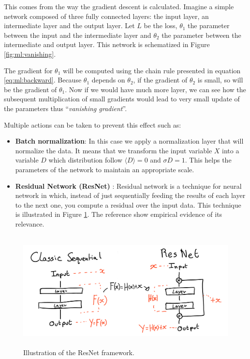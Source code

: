 \documentclass[../main.tex]{subfiles}
\begin{document}
This comes from the way the gradient descent is calculated. Imagine a simple network composed of three fully connected layers: the input layer, an intermediate layer and the output layer. Let $L$ be the loss, $\theta_1$ the parameter between the input and the intermediate layer and $\theta_2$ the parameter between the intermediate and output layer. This network is schematized in Figure \ref{fig:ml:vanishing}.

The gradient for $\theta_1$ will be computed using the chain rule presented in equation \ref{eq:ml:backward}. Because $\theta_1$ depends on $\theta_2$, if the gradient of $\theta_2$ is small, so will be the gradient of $\theta_1$. Now if we would have much more layer, we can see how the subsequent multiplication of small gradients would lead to very small update of the parameters thus ``\textit{vanishing gradient}''.

Multiple actions can be taken to prevent this effect such as:
\begin{itemize}
  \item \textbf{Batch normalization}: In this case we apply a normalization layer that will normalize the data. It means that we transform the input variable $X$ into a variable $D$ which distribution follow $\langle D \rangle = 0$ and $\sigma D = 1$. This helps the parameters of the network to maintain an appropriate scale.
  \item \textbf{Residual Network (ResNet)} \cite{he_deep_2016}: Residual network is a technique for neural network in which, instead of just sequentially feeding the results of each layer to the next one, you compute a residual over the input data. This technique is illustrated in Figure \ref{fig:ml:resnet}. The reference \cite{he_deep_2016} show empirical evidence of its relevance.
\end{itemize}


\begin{figure}[ht]
  \centering
  \includegraphics[height=6cm]{images/ml/resnet.png}
  \caption{Illustration of the ResNet framework.}
  \label{fig:ml:resnet}
\end{figure}
\end{document}
